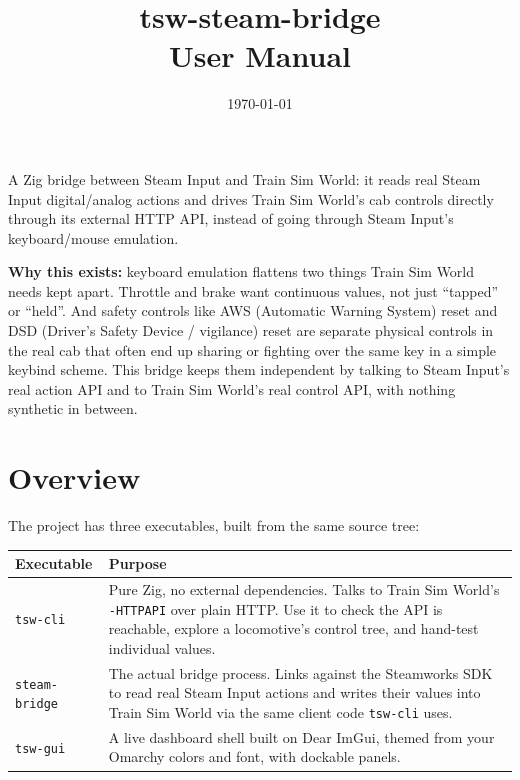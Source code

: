 \documentclass[11pt,a4paper]{article}
\title{\textcolor{accent}{\Huge tsw-steam-bridge}\\[0.3em]\Large User Manual}
\author{}
\date{\today}
\newcommand{\code}[1]{\texttt{#1}}
\begin{document}
\maketitle
\thispagestyle{empty}

\vspace{1cm}
\noindent
A Zig bridge between Steam Input and Train Sim World: it reads real Steam
Input digital/analog actions and drives Train Sim World's cab controls
directly through its external HTTP API, instead of going through Steam
Input's keyboard/mouse emulation.

\vspace{0.5cm}
\noindent
\textbf{Why this exists:} keyboard emulation flattens two things Train Sim
World needs kept apart. Throttle and brake want continuous values, not
just ``tapped'' or ``held''. And safety controls like AWS (Automatic
Warning System) reset and DSD (Driver's Safety Device / vigilance) reset
are separate physical controls in the real cab that often end up sharing
or fighting over the same key in a simple keybind scheme. This bridge
keeps them independent by talking to Steam Input's real action API and to
Train Sim World's real control API, with nothing synthetic in between.

\newpage
\tableofcontents
\newpage

\section{Overview}

The project has three executables, built from the same source tree:

\begin{center}
\begin{tabularx}{\textwidth}{@{}l X@{}}
\toprule
\textbf{Executable} & \textbf{Purpose} \\
\midrule
\code{tsw-cli} & Pure Zig, no external dependencies. Talks to Train Sim
World's \code{-HTTPAPI} over plain HTTP. Use it to check the API is
reachable, explore a locomotive's control tree, and hand-test individual
values. \\[0.5em]
\code{steam-bridge} & The actual bridge process. Links against the
Steamworks SDK to read real Steam Input actions and writes their values
into Train Sim World via the same client code \code{tsw-cli} uses. \\[0.5em]
\code{tsw-gui} & A live dashboard shell built on Dear ImGui, themed from
your Omarchy colors and font, with dockable panels. \\
\bottomrule
\end{tabularx}
\end{center}
\end{document}
